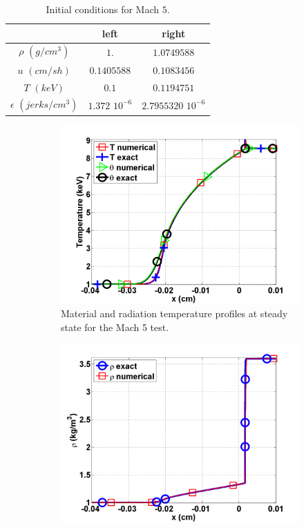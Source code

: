 \documentclass{mc2015}
\begin{document}
%
\begin{table}[H]
\caption{\label{tbl:table6} Initial conditions for Mach $5$.}
\begin{center}
\begin{tabular}{|c|c|c|}
\hline 
 & left  & right \\ \hline
$\rho$ $(g/cm^3)$ &$1.$ & $1.0749588$ \\ \hline
$u$ $(cm/sh)$& $0.1405588$ & $0.1083456$ \\ \hline
$T$ $(keV)$& $0.1$ & $0.1194751$\\ \hline
$\epsilon$ $(jerks/cm^3)$ & $1.372$ $10^{-6}$ & $2.7955320$ $10^{-6}$\\
\hline
\end{tabular}  
\end{center}  
\end{table}
%
\begin{figure}[H]
\centering
\begin{subfigure}[b]{0.47\textwidth}
                \centering
                \includegraphics[width=\textwidth]{figs/Mach_5_nel_500_temperature.png}
        \caption{Material and radiation temperature profiles at steady state for the Mach 5 test.}\label{fig:Mach5_temp}
\end{subfigure}
\begin{subfigure}[b]{0.47\textwidth}
                \centering
                \includegraphics[width=\textwidth]{figs/Mach_5_nel_500_density.png}

\end{subfigure}
\end{figure}
\end{document}
